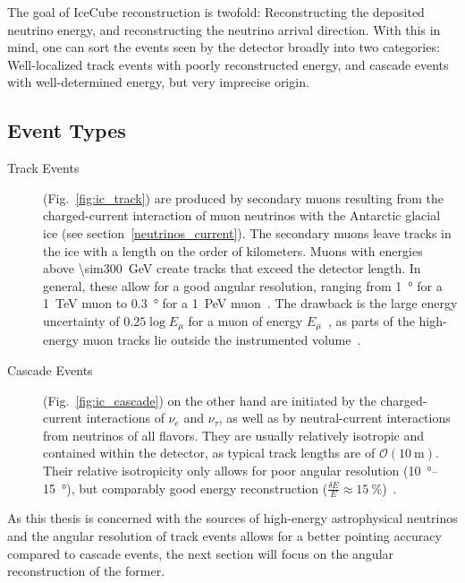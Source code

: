 The goal of IceCube reconstruction is twofold: Reconstructing the deposited neutrino energy, and reconstructing the neutrino arrival direction. With this in mind, one can sort the events seen by the detector broadly into two categories: Well-localized track events with poorly reconstructed energy, and cascade events with well-determined energy, but very imprecise origin.

\subsection{Event Types}\label{ic_event_types}

\begin{description}
    \item[Track Events] (Fig.~\ref{fig:ic_track}) are produced by secondary muons resulting from the charged-current interaction of muon neutrinos with the Antarctic glacial ice (see section~\ref{neutrinos_current}). The secondary muons leave tracks in the ice with a length on the order of kilometers. Muons with energies above \SI{\sim300}{\giga\eV} create tracks that exceed the detector length. In general, these allow for a good angular resolution, ranging from \SI{1}{\degree} for a \SI{1}{\TeV} muon to \SI{0.3}{\degree} for a \SI{1}{\peta\eV} muon~. The drawback is the large energy uncertainty of $0.25 \log{E_\mu}$ for a muon of energy $E_\mu$~, as parts of the high-energy muon tracks lie outside the instrumented volume~.

    \item[Cascade Events] (Fig.~\ref{fig:ic_cascade}) on the other hand are initiated by the charged-current interactions of $\nu_e$ and $\nu_\tau$, as well as by neutral-current interactions from neutrinos of all flavors. They are usually relatively isotropic and contained within the detector, as typical track lengths are of $\mathcal{O}(\SI{10}{\meter})$. Their relative isotropicity only allows for poor angular resolution (\SIrange{10}{15}{\degree}), but comparably good energy reconstruction ($\frac{\delta E}{E} \approx \SI{15}{\percent}$)~\cite{Aartsen2017a}.
\end{description}

As this thesis is concerned with the sources of high-energy astrophysical neutrinos and the angular resolution of track events allows for a better pointing accuracy compared to cascade events, the next section will focus on the angular reconstruction of the former.

